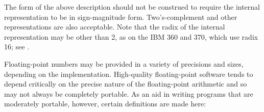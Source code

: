 \beforenoterule
\begin{implementation}
The form of the above description should not be construed
to require the internal representation to be in sign-magnitude form.
Two's-complement and other representations are also acceptable.  Note
that the radix of the internal representation may be other than 2, as on
the IBM 360 and 370, which use radix 16; see
.
\end{implementation}
\afternoterule

Floating-point numbers may be provided in a variety of precisions and sizes,
depending on the implementation.  High-quality floating-point
software tends to depend critically on the precise nature of the
floating-point arithmetic and so may not always be completely portable.
As an aid in writing programs that are
moderately portable, however, certain definitions are made here:

